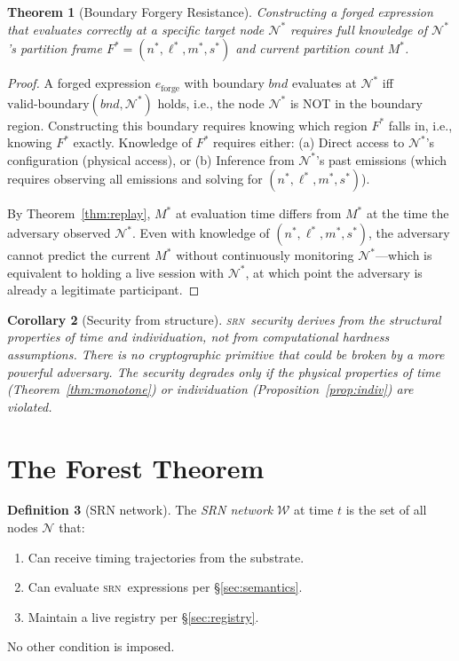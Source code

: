 \documentclass[twocolumn,11pt,a4paper]{article}
\newtheorem{theorem}{Theorem}[section]
\newtheorem{corollary}[theorem]{Corollary}
\theoremstyle{definition}
\newtheorem{definition}[theorem]{Definition}
\theoremstyle{remark}
\newcommand{\srn}{\textsc{srn}}
\newcommand{\Node}{\mathcal{N}}
\begin{document}
\begin{theorem}[Boundary Forgery Resistance]
\label{thm:forgery}
Constructing a forged expression that evaluates correctly at a specific
target node $\Node^*$ requires full knowledge of $\Node^*$'s partition
frame $F^* = (n^*, \ell^*, m^*, s^*)$ and current partition count $M^*$.
\end{theorem}
\begin{proof}
A forged expression $e_{\mathrm{forge}}$ with boundary $bnd$ evaluates
at $\Node^*$ iff $\text{valid-boundary}(bnd, \Node^*)$ holds, i.e., the
node $\Node^*$ is NOT in the boundary region.  Constructing this
boundary requires knowing which region $F^*$ falls in, i.e., knowing
$F^*$ exactly.  Knowledge of $F^*$ requires either:
(a) Direct access to $\Node^*$'s configuration (physical access), or
(b) Inference from $\Node^*$'s past emissions (which requires observing
    all emissions and solving for $(n^*, \ell^*, m^*, s^*)$).

By Theorem~\ref{thm:replay}, $M^*$ at evaluation time differs from
$M^*$ at the time the adversary observed $\Node^*$.  Even with knowledge
of $(n^*, \ell^*, m^*, s^*)$, the adversary cannot predict the current
$M^*$ without continuously monitoring $\Node^*$—which is equivalent to
holding a live session with $\Node^*$, at which point the adversary is
already a legitimate participant.
\end{proof}

\begin{corollary}[Security from structure]
\label{cor:structsec}
\srn\ security derives from the structural properties of time and
individuation, not from computational hardness assumptions.  There is no
cryptographic primitive that could be broken by a more powerful
adversary.  The security degrades only if the physical properties of
time (Theorem~\ref{thm:monotone}) or individuation
(Proposition~\ref{prop:indiv}) are violated.
\end{corollary}

\section{The Forest Theorem}
\label{sec:forest}

\begin{definition}[SRN network]
The \emph{SRN network} $\mathcal{W}$ at time $t$ is the set of all
nodes $\Node$ that:
\begin{enumerate}[noitemsep,topsep=2pt]
\item Can receive timing trajectories from the substrate.
\item Can evaluate \srn\ expressions per \S\ref{sec:semantics}.
\item Maintain a live registry per \S\ref{sec:registry}.
\end{enumerate}
No other condition is imposed.
\end{definition}
\end{document}
